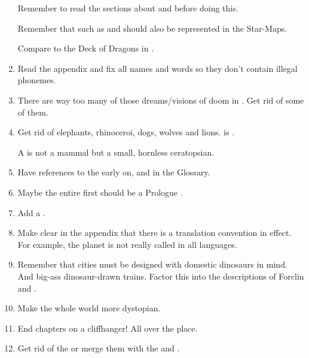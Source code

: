 \begin{enumerate}
    Remember to read the sections about  and  before doing this. 
    
    Remember that \nexi{} such as \Malcur and \Nithdornazsh{} should also be represented in the Star-Maps. 
    
    Compare to the Deck of Dragons in \cite{StevenEriksonIanCameronEsslemont:MalazanBookoftheFallen}. 
  
  \item 
    Read the  appendix and fix all names and words so they don't contain illegal phonemes. 
  
  \item 
    There are way too many of those dreams/visions of doom in \Malcur.
    Get rid of some of them. 
  
  \item 
    Get rid of elephants, rhinoceroi, dogs, wolves and lions. 
    \Miith{} is . 
  
    A \belwan{} is not a mammal but a small, hornless ceratopsian. 
    
  \item 
    Have references to the  early on, and in the Glossary. 
  
  \item 
    Maybe the entire first  should be a Prologue . 
  
  \item 
    Add a . 
  
  \item 
    Make clear in the appendix that there is a translation convention in effect.
    For example, the planet is not really called \quo{\Miith} in all languages.
  
  \item 
    Remember that cities must be designed with domestic dinosaurs in mind.
    And big-ass dinosaur-drawn trains. 
    Factor this into the descriptions of Forclin and \Malcur.

  \item 
    Make the whole world more dystopian.

  \item 
    End chapters on a cliffhanger! 
    All over the place.

  \item 
    Get rid of the  or merge them with the \noggyaleth and \xss.
  

\end{enumerate}
